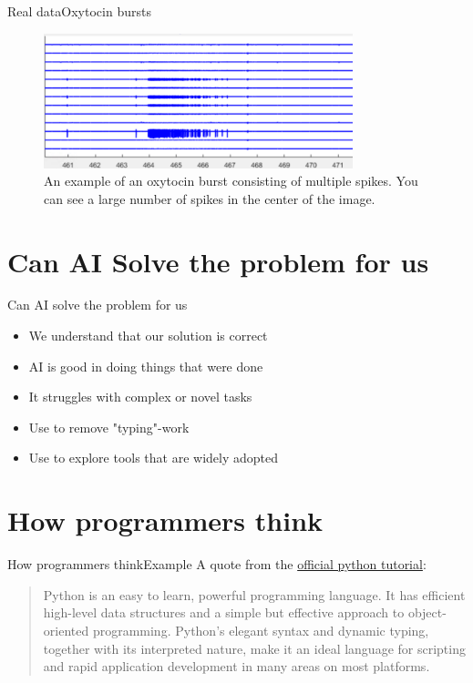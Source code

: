 \documentclass[aspectratio=169]{beamer}
\begin{document}
\begin{frame}{Real data}{Oxytocin bursts}
\begin{figure}[h]
\centering
\includegraphics[width=0.8\textwidth]{../img/OTburst.png}
\caption{
	An example of an oxytocin burst consisting of multiple spikes.
	You can see a large number of spikes in the center of the image.
}
\end{figure}
\end{frame}

\section{Can AI Solve the problem for us}
\begin{frame}{Can AI solve the problem for us}
	\begin{itemize}
		\item We understand that our solution is correct
		\pause
		\item AI is good in doing things that were done
		\pause
		\item It struggles with complex or novel tasks
		\pause
		\item Use to remove "typing"-work
		\pause
		\item Use to explore tools that are widely adopted
	\end{itemize}
\end{frame}

\section{How programmers think}
\begin{frame}{How programmers think}{Example}
A quote from the \href{https://docs.python.org/3/tutorial/index.html}{official python tutorial}:
\begin{quote}
	Python is an easy to learn, powerful programming language.
	It has efficient high-level data structures
	and a simple but effective approach to object-oriented programming.
	Python’s elegant syntax and dynamic typing, together with its interpreted nature,
	make it an ideal language for scripting and rapid application development in many areas on most platforms.
\end{quote}
\end{frame}
\end{document}
